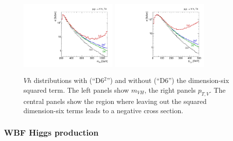 \begin{figure}[t]
  \includegraphics[width=0.43\textwidth]{fig/validity/VH_T4_mVH}
  \hspace*{0.05\textwidth}
  \includegraphics[width=0.43\textwidth]{fig/validity/VH_T4_Vpt}
  \caption{$Vh$ distributions with (``D6$^{2}$'') and without (``D6'')
    the dimension-six squared
    term. The left panels show $m_{VH}$, the right panels
    $p_{T,V}$. The central panels show the region where leaving out
    the squared dimension-six terms leads to a negative cross section.}
  \label{fig:validity_squared_VH}
\end{figure}


\subsubsection*{WBF Higgs production}

